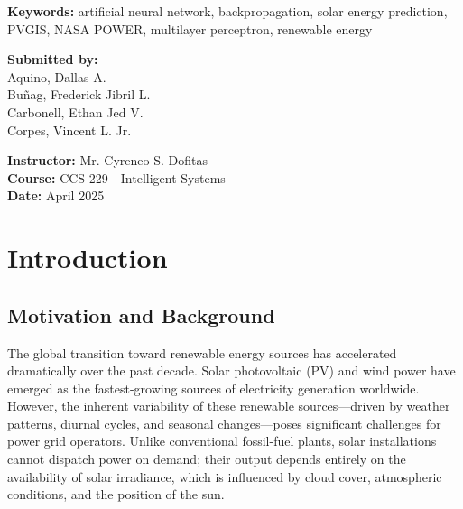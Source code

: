 \documentclass[11pt, a4paper]{article}
\begin{document}
\begin{titlepage}
\begin{tcolorbox}[colback=lightgray, colframe=rulecolor, boxrule=0.5pt, arc=2mm, width=\textwidth]
        \vspace{0.2cm}
        \noindent\textbf{Keywords:} artificial neural network, backpropagation, solar energy
        prediction, PVGIS, NASA POWER, multilayer perceptron, renewable energy
    \end{tcolorbox}
    
    \vfill
    
    \begin{minipage}[t]{0.45\textwidth}
        \begin{flushleft}
            \textbf{\textcolor{navyblue}{Submitted by:}}\\[0.2cm]
            Aquino, Dallas A.\\
            Buñag, Frederick Jibril L.\\
            Carbonell, Ethan Jed V.\\
            Corpes, Vincent L. Jr.
        \end{flushleft}
    \end{minipage}
    \hfill
    \begin{minipage}[t]{0.45\textwidth}
        \begin{flushleft}
            \textbf{\textcolor{navyblue}{Instructor:}} Mr. Cyreneo S. Dofitas \\[0.2cm]
            \textbf{\textcolor{navyblue}{Course:}} CCS 229 - Intelligent Systems\\[0.2cm]
            \textbf{\textcolor{navyblue}{Date:}} April 2025
        \end{flushleft}
    \end{minipage}
    
    \vspace*{1cm}
\end{titlepage}

\newpage
{
\small
\tableofcontents
}
\newpage

\section{Introduction}\label{sec:intro}

\subsection{Motivation and Background}

The global transition toward renewable energy sources has accelerated dramatically
over the past decade. Solar photovoltaic (PV) and wind power have emerged as the
fastest-growing sources of electricity generation worldwide. However, the inherent
variability of these renewable sources---driven by weather patterns, diurnal cycles,
and seasonal changes---poses significant challenges for power grid operators.
Unlike conventional fossil-fuel plants, solar installations cannot dispatch power on
demand; their output depends entirely on the availability of solar irradiance, which
is influenced by cloud cover, atmospheric conditions, and the position of the sun.
\end{document}
